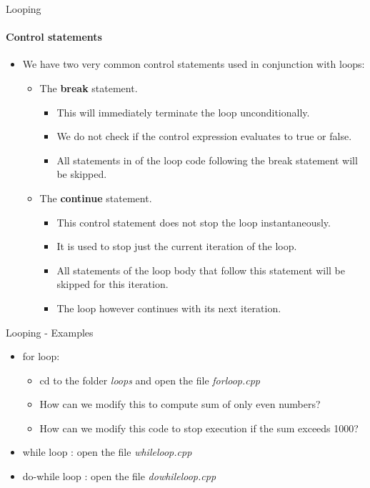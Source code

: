 \documentclass[aspectratio=169]{beamer}
\begin{document}
\begin{frame}[fragile]{Looping}
    \framesubtitle{Control statements}
    \begin{itemize}
        \item We have two very common control statements used in conjunction with loops:
        \begin{itemize}
            \item The \textbf{break} statement.
            \begin{itemize}
                \item This will immediately terminate the loop unconditionally.
                \item We do not check if the control expression evaluates to true or false.
                \item All statements in of the loop code following the break statement will be skipped.
            \end{itemize}
            \item The \textbf{continue} statement.
            \begin{itemize}
                \item This control statement does not stop the loop instantaneously.
                \item It is used to stop just the current iteration of the loop.
                \item All statements of the loop body that follow this statement will be skipped for this iteration.
                \item The loop however continues with its next iteration.
            \end{itemize}
        \end{itemize}
    \end{itemize}
\end{frame}

\begin{frame}[fragile]{Looping - Examples}
    \begin{itemize}
        \item for loop:
        \begin{itemize}
            \item cd to the folder \textit{loops} and open the file \textit{forloop.cpp}
            \item How can we modify this to compute sum of only even numbers?
            \item How can we modify this code to stop execution if the sum exceeds 1000?
        \end{itemize}
        \item while loop : open the file \textit{whileloop.cpp}
        \item do-while loop : open the file \textit{dowhileloop.cpp}
    \end{itemize}
\end{frame}
\end{document}
